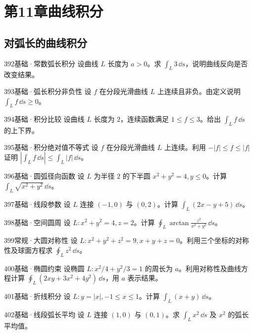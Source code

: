 \section{第11章\quad 曲线积分}
\subsection{对弧长的曲线积分}
\begin{exercise}{392}{基础·常数弧长积分}
设曲线 $L$ 长度为 $a>0$。求 $\int_L3\,\dd s$，说明曲线反向是否改变结果。
\end{exercise}
\begin{exercise}{393}{基础·弧长积分非负性}
设 $f$ 在分段光滑曲线 $L$ 上连续且非负。由定义说明 $\int_Lf\,\dd s\geq0$。
\end{exercise}
\begin{exercise}{394}{基础·积分比较}
设曲线 $L$ 长度为 $2$，连续函数满足 $1\leq f\leq3$。给出 $\int_L f\,\dd s$ 的上下界。
\end{exercise}
\begin{exercise}{395}{基础·积分绝对值不等式}
设 $f$ 在分段光滑曲线 $L$ 上连续。利用 $-|f|\leq f\leq|f|$ 证明 $|\int_Lf\,\dd s|\leq\int_L|f|\,\dd s$。
\end{exercise}
\begin{exercise}{396}{基础·圆弧径向函数}
设 $L$ 为半径 $2$ 的下半圆 $x^2+y^2=4,y\leq0$。计算 $\int_L\sqrt{x^2+y^2}\,\dd s$。
\end{exercise}
\begin{exercise}{397}{基础·线段参数}
设 $L$ 连接 $(-1,0)$ 与 $(0,2)$。计算 $\int_L(2x-y+5)\,\dd s$。
\end{exercise}
\begin{exercise}{398}{基础·空间圆周}
设 $L:x^2+y^2=4,z=2$。计算 $\oint_L\arctan\frac{z^2}{x^2+y^2}\,\dd s$。
\end{exercise}
\begin{exercise}{399}{常规·大圆对称性}
设 $L:x^2+y^2+z^2=9,x+y+z=0$。利用三个坐标的对称性及球面方程求 $\oint_Lz^2\,\dd s$。
\end{exercise}
\begin{exercise}{400}{基础·椭圆约束}
设椭圆 $L:x^2/4+y^2/3=1$ 的周长为 $a$。利用对称性及曲线方程计算 $\oint_L(2xy+3x^2+4y^2)\,\dd s$，用 $a$ 表示结果。
\end{exercise}
\begin{exercise}{401}{基础·折线积分}
设 $L:y=|x|,-1\leq x\leq1$。计算 $\int_L(x+y)\,\dd s$。
\end{exercise}
\begin{exercise}{402}{基础·线段弧长平均}
设 $L$ 连接 $(1,0)$ 与 $(0,1)$。求 $\int_Lx^2\,\dd s$ 及 $x^2$ 的弧长平均值。
\end{exercise}
